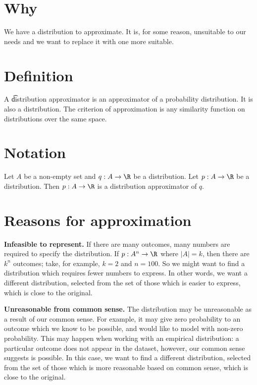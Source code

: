 

\section*{Why}

We have a distribution to approximate.
It is, for some reason, unsuitable to our needs and we want to replace it with one more suitable.

\section*{Definition}

A \t{distribution approximator} is an approximator of a probability distribution.
It is also a distribution.
The criterion of approximation is any similarity function on distributions over the same space.

\section*{Notation}

Let $A$ be a non-empty set and $q: A \to \R $ be a distribution.
Let $p: A \to \R $ be a distribution.
Then $p: A \to \R $ is a distribution approximator of $q$.

\section*{Reasons for approximation}


\textbf{Infeasible to represent.}
If there are many outcomes, many numbers are required to specify the distribution.
If $p: A^n \to \R $ where $\mid A\mid  = k$, then there are $k^n$ outcomes; take, for example, $k = 2$ and $n = 100$.
So we might want to find a distribution which requires fewer numbers to express.
In other words, we want a different distribution, selected from the set of those which is easier to express, which is close to the original.

\textbf{Unreasonable from common sense.}
The distribution may be unreasonable as a result of our common sense.
For example, it may give zero probability to an outcome which we know to be possible, and would like to model with non-zero probability.
This may happen when working with an empirical distribution: a particular outcome does not appear in the dataset, however, our common sense suggests is possible.
In this case, we want to find a different distribution, selected from the set of those which is more reasonable based on common sense, which is close to the original.
